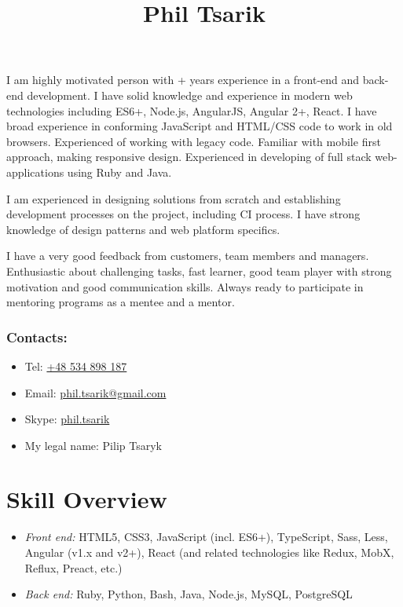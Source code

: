 \documentclass[a4paper, 12pt]{article}
\title{Phil Tsarik}
\author{}
\date{}
\newcommand{\itemlabel}[1]{
    \textit{#1:}}
\newcommand{\defvalue}[2]{\ifx#1\empty#2\else#1\fi}
\newcommand{\yearsexp}{%
    \FPeval{\result}{clip(\the\year - 2011)}%
    \defvalue{\result}{6+}}
\begin{document}
\maketitle

I am highly motivated person with \yearsexp{} years experience in a front-end and back-end development.
I have solid knowledge and experience in modern web technologies including ES6+, Node.js, AngularJS, Angular 2+, React.
I have broad experience in conforming JavaScript and HTML/CSS code to work in old browsers.
Experienced of working with legacy code.
Familiar with mobile first approach, making responsive design.
Experienced in developing of full stack web-applications using Ruby and Java.

I am experienced in designing solutions from scratch and establishing development processes on the project, including CI process.
I have strong knowledge of design patterns and web platform specifics.

I have a very good feedback from customers, team members and managers.
Enthusiastic about challenging tasks, fast learner, good team player with strong motivation and good communication skills.
Always ready to participate in mentoring programs as a mentee and a mentor.

\subsubsection*{Contacts:}
\begin{itemize}
    \item Tel: \href{tel:+48534898187}{+48 534 898 187}
    \item Email: \href{mailto:phil.tsarik@gmail.com}{phil.tsarik@gmail.com}
    \item Skype: \href{callto:phil.tsarik}{phil.tsarik}
    \item My legal name: Pilip Tsaryk
\end{itemize}


\section*{Skill Overview}

    \begin{itemize}
        \item \itemlabel{Front end} HTML5, CSS3, JavaScript (incl. ES6+), TypeScript, Sass, Less, Angular (v1.x and v2+), React (and related technologies like Redux, MobX, Reflux, Preact, etc.)
        \item \itemlabel{Back end} Ruby, Python, Bash, Java, Node.js, MySQL, PostgreSQL
    \end{itemize}
\end{document}
